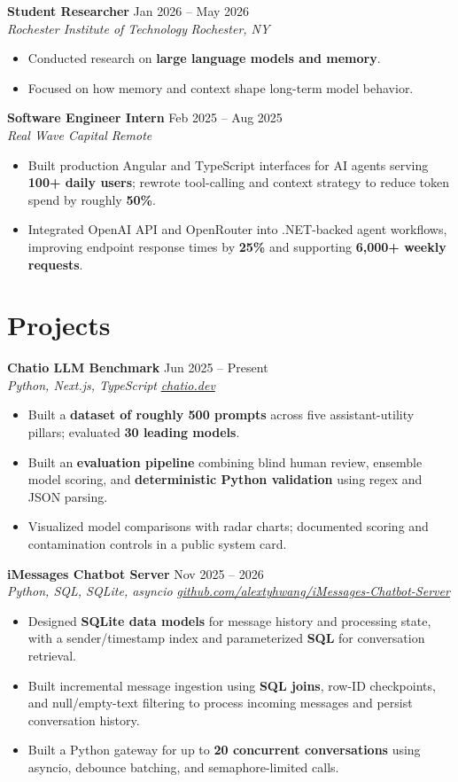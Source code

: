 \documentclass[10pt,letterpaper]{article}
\newif\ifresumeFirstRole
\newcommand{\resumeRole}[4]{%
  \ifresumeFirstRole
    \global\resumeFirstRolefalse
  \else
    \vspace{0pt plus 1fill}%
  \fi
  \textbf{#1} \hfill #2\\
  \textit{#3} \hfill \textit{#4}
}
\begin{document}
\resumeRole{Student Researcher}{Jan 2026 -- May 2026}{Rochester Institute of Technology}{Rochester, NY}
\begin{itemize}
  \item Conducted research on \textbf{large language models and memory}.
  \item Focused on how memory and context shape long-term model behavior.
\end{itemize}

\resumeRole{Software Engineer Intern}{Feb 2025 -- Aug 2025}{Real Wave Capital}{Remote}
\begin{itemize}
  \item Built production Angular and TypeScript interfaces for AI agents serving \textbf{100+ daily users}; rewrote tool-calling and context strategy to reduce token spend by roughly \textbf{50\%}.
  \item Integrated OpenAI API and OpenRouter into .NET-backed agent workflows, improving endpoint response times by \textbf{25\%} and supporting \textbf{6,000+ weekly requests}.
\end{itemize}

\section*{Projects}
\resumeRole{Chatio LLM Benchmark}{Jun 2025 -- Present}{Python, Next.js, TypeScript}{\href{https://chatio.dev}{chatio.dev}}
\begin{itemize}
  \item Built a \textbf{dataset of roughly 500 prompts} across five assistant-utility pillars; evaluated \textbf{30 leading models}.
  \item Built an \textbf{evaluation pipeline} combining blind human review, ensemble model scoring, and \textbf{deterministic Python validation} using regex and JSON parsing.
  \item Visualized model comparisons with radar charts; documented scoring and contamination controls in a public system card.
\end{itemize}

\resumeRole{iMessages Chatbot Server}{Nov 2025 -- 2026}{Python, SQL, SQLite, asyncio}{\href{https://github.com/alextyhwang/iMessages-Chatbot-Server}{github.com/alextyhwang/iMessages-Chatbot-Server}}
\begin{itemize}
  \item Designed \textbf{SQLite data models} for message history and processing state, with a sender/timestamp index and parameterized \textbf{SQL} for conversation retrieval.
  \item Built incremental message ingestion using \textbf{SQL joins}, row-ID checkpoints, and null/empty-text filtering to process incoming messages and persist conversation history.
  \item Built a Python gateway for up to \textbf{20 concurrent conversations} using asyncio, debounce batching, and semaphore-limited calls.
\end{itemize}
\end{document}
